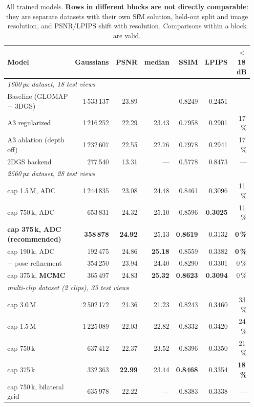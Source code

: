 \begin{table}[h]
\centering\small
\begin{tabular}{lrrrrrr}
\toprule
Model & Gaussians & PSNR & median & SSIM & LPIPS & $<$18\,dB \\
\midrule
\multicolumn{7}{l}{\emph{1600\,px dataset, 18 test views}}\\
Baseline (GLOMAP + 3DGS)      & 1\,533\,137 & 23.89 & --- & 0.8249 & 0.2451 & --- \\
A3 regularized                 & 1\,216\,252 & 22.29 & 23.43 & 0.7958 & 0.2901 & 17\,\% \\
A3 ablation (depth off)        & 1\,232\,607 & 22.55 & 22.76 & 0.7978 & 0.2941 & 17\,\% \\
2DGS backend                   &   277\,540 & 13.31 & --- & 0.5778 & 0.8473 & --- \\
\midrule
\multicolumn{7}{l}{\emph{2560\,px dataset, 28 test views}}\\
cap 1.5\,M, ADC                & 1\,244\,835 & 23.08 & 24.48 & 0.8461 & 0.3096 & 11\,\% \\
cap 750\,k, ADC                &   653\,831 & 24.32 & 25.10 & 0.8596 & \textbf{0.3025} & 11\,\% \\
\textbf{cap 375\,k, ADC (recommended)} & \textbf{358\,878} & \textbf{24.92} & 25.13 & \textbf{0.8619} & 0.3132 & \textbf{0\,\%} \\
cap 190\,k, ADC                &   192\,475 & 24.86 & \textbf{25.18} & 0.8559 & 0.3382 & \textbf{0\,\%} \\
$+$ pose refinement            &   354\,250 & 23.94 & 24.40 & 0.8290 & 0.3301 & 0\,\% \\
cap 375\,k, \textbf{MCMC}      &   365\,497 & 24.83 & \textbf{25.32} & \textbf{0.8623} & \textbf{0.3094} & 0\,\% \\
\midrule
\multicolumn{7}{l}{\emph{multi-clip dataset (2 clips), 33 test views}}\\
cap 3.0\,M                     & 2\,502\,172 & 21.36 & 21.23 & 0.8243 & 0.3460 & 33\,\% \\
cap 1.5\,M                     & 1\,225\,089 & 22.03 & 22.82 & 0.8332 & 0.3420 & 24\,\% \\
cap 750\,k                     &   637\,412 & 22.37 & 23.52 & 0.8396 & 0.3350 & 21\,\% \\
cap 375\,k                     &   332\,363 & \textbf{22.99} & 23.44 & \textbf{0.8468} & 0.3354 & \textbf{18\,\%} \\
cap 750\,k, bilateral grid     &   635\,978 & 22.22 & --- & 0.8383 & 0.3338 & --- \\
\bottomrule
\end{tabular}
\caption{All trained models. \textbf{Rows in different blocks are not directly
comparable}: they are separate datasets with their own SfM solution, held-out split
and image resolution, and PSNR/LPIPS shift with resolution. Comparisons within a
block are valid.}
\label{tab:results}
\end{table}

